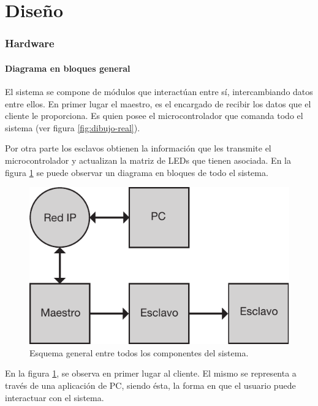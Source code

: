 \part{Diseño}\label{part:diseno}

\section{Hardware}\label{sec:hw}
\subsection{Diagrama en bloques general}
El sistema se compone de módulos que interactúan entre sí, intercambiando datos entre ellos. En primer lugar el maestro, es el encargado de recibir los datos que el cliente le proporciona. Es quien  posee el microcontrolador que comanda todo el sistema (ver figura \ref{fig:dibujo-real}).

Por otra parte los esclavos obtienen la información que les transmite el microcontrolador y actualizan la matriz de LEDs que tienen asociada. En la figura \ref{fig:diagrama-bloques-general} se puede observar un diagrama en bloques de todo el sistema.

\begin{figure}[!ht]
	\centering
	\includegraphics[scale=1]{imagenes/esquema-general.pdf}
	\caption{Esquema general entre todos los componentes del sistema.}
	\label{fig:diagrama-bloques-general}
\end{figure}

En la figura \ref{fig:diagrama-bloques-general}, se observa en primer lugar al cliente. El mismo se representa a través de una aplicación de PC, siendo ésta, la forma en que el usuario puede interactuar con el sistema.


